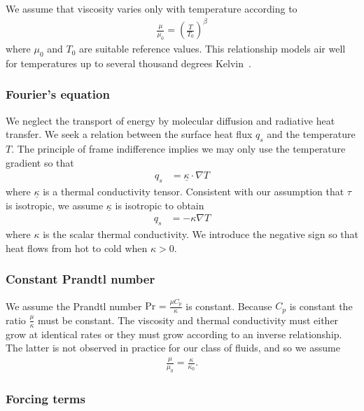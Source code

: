 \documentclass[letterpaper,11pt,nointlimits,reqno]{amsart}
\newcommand{\Prandtl}[1][]{\ensuremath{\mbox{Pr}_{#1}}}
\begin{document}
We assume that viscosity varies only with temperature according to
\begin{align}
\label{eq:powerlawviscosity}
\frac{\mu}{\mu_{0}}=\left(\frac{T}{T_{0}}\right)^{\beta}
\end{align}
where $\mu_{0}$ and $T_{0}$ are suitable reference values.  This
relationship models air well for temperatures up to several thousand
degrees Kelvin~\cite{NASA-TR-R-132}.

\subsubsection{Fourier's equation}

We neglect the transport of energy by molecular diffusion and radiative
heat transfer.  We seek a relation between the surface heat flux $q_{s}$
and the temperature $T$.  The principle of frame indifference implies
we may only use the temperature gradient so that
\begin{align}
  \label{eq:fouriertensorlaw}
  q_{s} &= \underline{\kappa} \cdot \nabla{} T
\end{align}
where $\underline{\kappa}$ is a thermal conductivity tensor.
Consistent with our assumption that $\tau$ is isotropic, we assume
$\underline{\kappa}$ is isotropic to obtain
\begin{align}
  \label{eq:fourierlaw}
  q_{s} &= - \kappa \nabla{} T
\end{align}
where $\kappa$ is the scalar thermal conductivity.  We introduce the
negative sign so that heat flows from hot to cold when $\kappa>0$.

\subsubsection{Constant Prandtl number}

We assume the Prandtl number $\Prandtl = \frac{\mu{}C_{p}}{\kappa}$ is constant.
Because $C_{p}$ is constant the ratio $\frac{\mu}{\kappa}$ must be
constant.  The viscosity and thermal conductivity must either grow at
identical rates or they must grow according to an inverse relationship.
The latter is not observed in practice for our class of fluids, and
so we assume
\begin{align}
  \frac{\mu}{\mu_{0}} = \frac{\kappa}{\kappa_{0}}
  .
  \label{eq:mukappa}
\end{align}

\subsubsection{Forcing terms}
\end{document}
